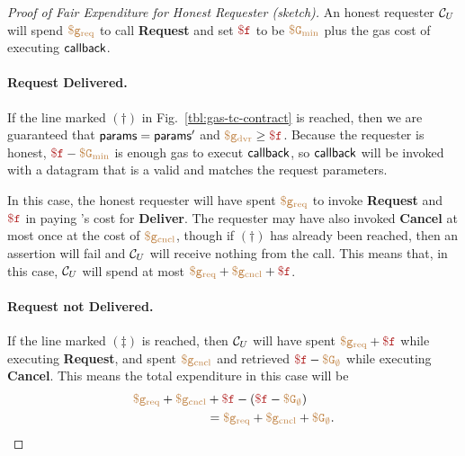\begin{proof}[Proof of Fair Expenditure for Honest Requester (sketch)]
An honest requester ${\cal C}_U$ will spend $\tt {\color{brown} \$g_\text{req} }$ to call {\bf Request}
and set $\fee$ to be $\tt {\color{brown} \$G_\text{min} }$ plus the gas cost of executing ${\sf callback}$.

\paragraph{Request Delivered.}
If the line marked $(\dagger)$ in Fig.~\ref{tbl:gas-tc-contract} is reached,
then we are guaranteed that ${\sf params} = {\sf params}'$ and $\gasdeliver \geq \fee$.
Because the requester is honest, $\fee - \constgasmin$ is enough gas to execut ${\sf callback}$,
so ${\sf callback}$ will be invoked with a datagram that is a valid and matches the request parameters.

In this case, the honest requester will have spent $\tt {\color{brown} \$g_\text{req} }$ to invoke {\bf Request} and $\fee$ in paying \tc's cost for {\bf Deliver}.
The requester may have also invoked {\bf Cancel} at most once at the cost of $\tt {\color{brown} \$g_\text{cncl} }$,
though if $(\dagger)$ has already been reached, then an assertion will fail and ${\cal C}_U$ will receive nothing from the call.
This means that, in this case, ${\cal C}_U$ will spend at most $\gasrequest + \gascancel + \fee$.


\paragraph{Request not Delivered.}
If the line marked $(\ddagger)$ is reached, then ${\cal C}_U$ will have spent
$\gasrequest + \fee$ while executing {\bf Request},
and spent $\tt {\color{brown} \$g_\text{cncl} }$ and retrieved $\fee - \constgascancel$ while executing {\bf Cancel}.
This means the total expenditure in this case will be
\begin{align*}
  \gasrequest + \gascancel & + \fee - (\fee - \constgascancel) \\
                           & = \gasrequest + \gascancel + \constgascancel.
\end{align*}
\end{proof}

